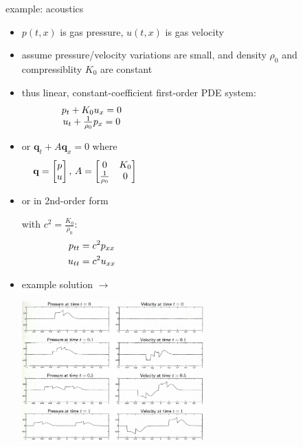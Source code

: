 \documentclass[10pt,hyperref,dvipsnames]{beamer}
\newcommand{\bq}{\mathbf{q}}
\begin{document}
\begin{frame}{example: acoustics}

\begin{itemize}
\item $p(t,x)$ is gas pressure, $u(t,x)$ is gas velocity
\item assume pressure/velocity variations are small, and density $\rho_0$ and compressiblity $K_0$ are constant
\item thus linear, constant-coefficient first-order PDE system:
$$\begin{matrix} p_t + K_0 u_x = 0 \\ u_t + \frac{1}{\rho_0} p_x = 0 \end{matrix} \hspace{70mm}$$
\item or $\bq_t + A \bq_x=0$ where
$$\bq = \begin{bmatrix} p \\ u \end{bmatrix}, \, A = \begin{bmatrix} 0 & K_0 \\ \frac{1}{\rho_0} & 0 \end{bmatrix} \hspace{75mm}$$
\item or in 2nd-order form

with $c^2 = \frac{K_0}{\rho_0}$:
\begin{align*}
p_{tt} &= c^2 p_{xx} \hspace{70mm} \\
u_{tt} &= c^2 u_{xx}
\end{align*}
\item example solution $\longrightarrow$

\vspace{-60mm}
\hfill \includegraphics[width=0.55\textwidth]{figs/leveque3p1}
\end{itemize}
\end{frame}
\end{document}
